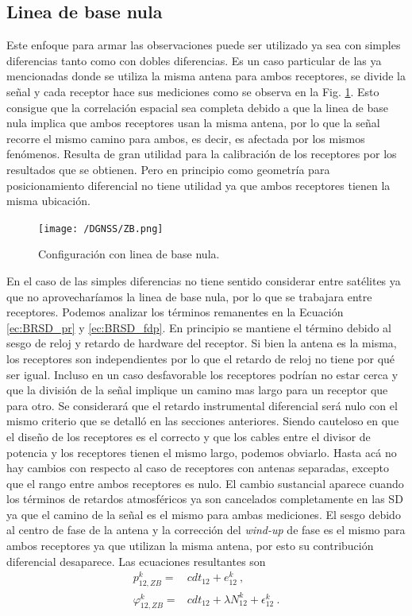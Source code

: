 \documentclass[a4paper,12pt,oneside,onecolumn,final,openright]{book}%
\begin{document}
\subsection{Linea de base nula}
	Este enfoque para armar las observaciones puede ser utilizado ya sea con simples diferencias tanto como con dobles diferencias. Es un caso particular de las ya mencionadas donde se utiliza la misma antena para ambos receptores, se divide la señal y cada receptor hace sus mediciones como se observa en la Fig. \ref{fig:ZB}. Esto consigue que la correlación espacial sea completa debido a que la linea de base nula implica que ambos receptores usan la misma antena, por lo que la señal recorre el mismo camino para ambos, es decir, es afectada por los mismos fenómenos. Resulta de gran utilidad para la calibración de los receptores por los resultados que se obtienen. Pero en principio como geometría para posicionamiento diferencial no tiene utilidad ya que ambos receptores tienen la misma ubicación.
	
\begin{figure}
    \centering
    \texttt{[image: /DGNSS/ZB.png]}
    \caption{Configuración con linea de base nula.}
    \label{fig:ZB}
\end{figure}

	En el caso de las simples diferencias no tiene sentido considerar entre satélites ya que no aprovecharíamos la linea de base nula, por lo que se trabajara entre receptores. Podemos analizar los términos remanentes en la Ecuación \eqref{ec:BRSD_pr} y \eqref{ec:BRSD_fdp}. En principio se mantiene el término debido al sesgo de reloj y retardo de hardware del receptor. Si bien la antena es la misma, los receptores son independientes por lo que el retardo de reloj no tiene por qué ser igual. Incluso en un caso desfavorable los receptores podrían no estar cerca y que la división de la señal implique un camino mas largo para un receptor que para otro. Se considerará que el retardo instrumental diferencial será nulo con el mismo criterio que se detalló en las secciones anteriores. Siendo cauteloso en que el diseño de los receptores es el correcto y que los cables entre el divisor de potencia y los receptores tienen el mismo largo, podemos obviarlo. Hasta acá no hay cambios con respecto al caso de receptores con antenas separadas, excepto que el rango entre ambos receptores es nulo. El cambio sustancial aparece cuando los términos de retardos atmosféricos ya son cancelados completamente en las SD ya que el camino de la señal es el mismo para ambas mediciones. El sesgo debido al centro de fase de la antena y la corrección del \textit{wind-up} de fase es el mismo para ambos receptores ya que utilizan la misma antena, por esto su contribución diferencial desaparece. Las ecuaciones resultantes son
\begin{align}
	p_{12,ZB}^k =& cdt_{12} + e_{12}^{k} \ , \\
	\varphi_{12,ZB}^k =& cdt_{12} + \lambda N_{12}^k + \epsilon_{12}^k \ .
\end{align}
	
\end{document}
